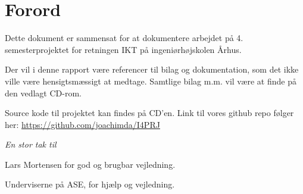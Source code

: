 \chapter{Forord}


Dette dokument er sammensat for at dokumentere arbejdet på 4. semesterprojektet for retningen IKT på ingeniørhøjskolen Århus.

Der vil i denne rapport være referencer til bilag og dokumentation, som det ikke ville være hensigtsmæssigt at medtage. Samtlige bilag m.m. vil være at finde på den vedlagt CD-rom. 

Source kode til projektet kan findes på CD'en. Link til vores github repo følger her: \newline \url{https://github.com/joachimda/I4PRJ}

\vspace{5mm}

\large{\textit{En stor tak til}}

\begin{displayquote}
    Lars Mortensen for god og brugbar vejledning.
\end{displayquote}

\begin{displayquote}
   Underviserne på ASE, for hjælp og vejledning.
\end{displayquote}

